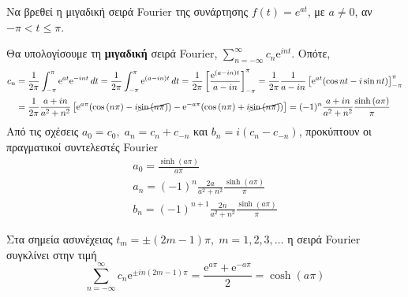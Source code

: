 \documentclass[a4paper,table]{report}
\begin{document}
\begin{mybox3}
  \begin{example}
    Να βρεθεί η μιγαδική σειρά \textlatin{Fourier} της συνάρτησης 
    $ f(t) = e^{at} $, με $ a \neq 0 $, αν $ - \pi < t \leq \pi $.
  \end{example}
\end{mybox3}
\begin{solution}
  Θα υπολογίσουμε τη \textbf{μιγαδική} σειρά \textlatin{Fourier,}  
  $ \sum\limits_{n=- \infty}^{\infty} c_{n} \mathrm{e}^{int} $. Οπότε, 
  \begin{align*}
    c_{n} &= \frac{1}{2 \pi} \int _{- \pi }^{\pi} \mathrm{e}^{at} \mathrm{e}^{-int } 
    \,{dt} = \frac{1}{2 \pi} \int _{- \pi }^{\pi} \mathrm{e}^{(a-in)t} \,{dt} = 
    \frac{1}{2 \pi} \left[\frac{\mathrm{e}^{(a-in)t}}{a- in} \right]_{- \pi }^{\pi} = 
    \frac{1}{2 \pi} \frac{1}{a-in} \left[\mathrm{e}^{at} (\cos{nt} - i 
    \sin{nt})\right]_{- \pi }^{\pi} \\
          &= \frac{1}{2 \pi} \frac{a+in}{a^{2}+n^{2}} 
          \left[\mathrm{e}^{a \pi} (\cos{(n \pi)- i \cancel{\sin{(n \pi)}}) - 
            \mathrm{e}^{-a \pi } (\cos{(n \pi )}}
          +i \cancel{\sin{(n \pi)}} )\right] = (-1)^{n} \frac{a+in}{a^{2}+n^{2}} 
          \frac{\sinh{(a \pi)}}{\pi}
  \end{align*}
  Από τις σχέσεις $ a_{0}= c_{0}, \; a_{n}= c_{n}+c_{-n} $ και 
  $ b_{n}=i(c_{n}-c_{-n}) $, προκύπτουν οι πραγματικοί συντελεστές \textlatin{Fourier}
  \begin{gather*}
    a_{0}= \frac{\sinh{(a \pi)}}{a\pi}  \\
    a_{n}= (-1)^{n} \frac{2a}{a^{2}+n^{2}} \frac{\sinh{(a \pi)}}{\pi} \\
    b_{n} = (-1)^{n+1} \frac{2n}{a^{2}+n^{2}} \frac{\sinh{(a \pi)}}{\pi} 
  \end{gather*} 
\end{solution}
Στα σημεία ασυνέχειας $ t_{m} = \pm (2m-1) \pi, \; m=1,2,3,\ldots $ η σειρά
\textlatin{Fourier} 
συγκλίνει στην τιμή 
\[
  \sum_{n=- \infty}^{\infty} c_{n} \mathrm{e}^{\pm in (2m-1) \pi} = 
  \frac{\mathrm{e}^{a \pi} + \mathrm{e}^{- a \pi}}{2} = \cosh{(a \pi)}  
\] 
\end{document}
